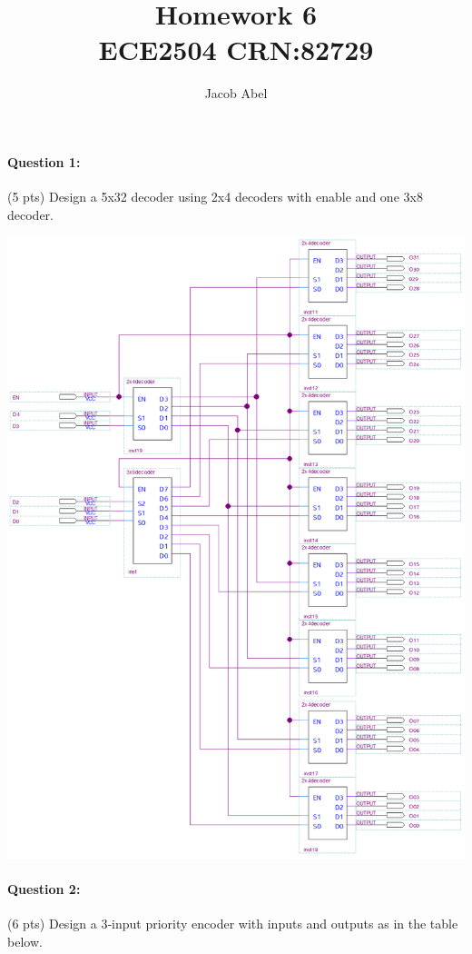 \documentclass[12pt,letterpaper,titlepage]{report}
\author{Jacob Abel}
\title{%
	Homework 6
	\\\large ECE2504 CRN:82729
}
\begin{document}
\maketitle
\begin{raggedright}
\raggedcolumns
\paragraph{Question 1:}
(5 pts) Design a 5x32 decoder using 2x4 decoders with enable and one 3x8 decoder.
\begin{center}
\includegraphics[width=\textwidth,height=0.9\textheight,keepaspectratio=true]{hw6p1}
\end{center}
\clearpage

\paragraph{Question 2:}
(6 pts) Design a 3‐input priority encoder with inputs and outputs as in the table below. 


\end{raggedright}
\end{document}
